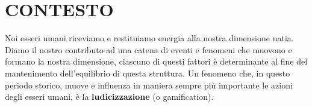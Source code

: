 \newcommand{\mylanguages}{italian} %
\newcommand{\mytitle}{Black Cube}
\newcommand{\mysubtitle}{Denaturalizzazione estremizzata, alienazione dalla dimensione umana}
\newcommand{\authorone}{Giancarlo Bottalico}
\newcommand{\institutione}{Conservatorio di musica "N. Piccinni", Bari}
\newcommand{\emailone}{giancarlobottalico@gmail.com}


	\maketitle
	\thispagestyle{empty}
	
\section{CONTESTO}
Noi esseri umani riceviamo e restituiamo energia alla nostra dimensione natia. Diamo il nostro contributo ad una catena di eventi e fenomeni che muovono e formano la nostra dimensione, ciascuno di questi fattori è determinante al fine del mantenimento dell'equilibrio di questa struttura. Un fenomeno che, in questo periodo storico, muove e influenza in maniera sempre più importante le azioni degli esseri umani, è la \textbf{ludicizzazione} (o gamification).

